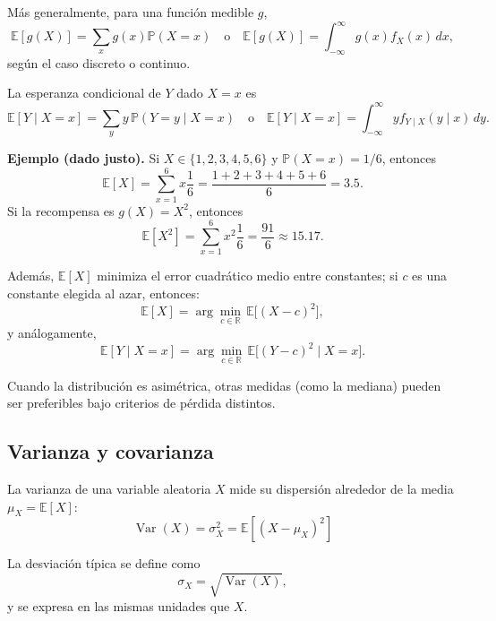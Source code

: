 \documentclass[12pt]{report} %
\begin{document}
Más generalmente, para una función medible $g$,
\begin{equation}
    \mathbb{E}[g(X)] = \sum_x g(x)\mathbb{P}(X=x)
    \quad\text{o}\quad
    \mathbb{E}[g(X)] = \int_{-\infty}^{\infty} g(x) f_X(x)\,dx,
    \label{eq:expected_value_function}
\end{equation}
según el caso discreto o continuo.

La esperanza condicional de $Y$ dado $X=x$ es
\begin{equation}
    \mathbb{E}[Y\mid X=x]=\sum_y y\,\mathbb{P}(Y=y\mid X=x)
    \quad\text{o}\quad
    \mathbb{E}[Y\mid X=x]=\int_{-\infty}^{\infty} y f_{Y\mid X}(y\mid x)\,dy.
    \label{eq:conditional_expectation_definition}
\end{equation}

\textbf{Ejemplo (dado justo).} Si $X\in\{1,2,3,4,5,6\}$ y $\mathbb{P}(X=x)=1/6$, entonces
$$
    \mathbb{E}[X]=\sum_{x=1}^{6} x\frac{1}{6}=\frac{1+2+3+4+5+6}{6}=3.5.
$$
Si la recompensa es $g(X)=X^2$, entonces
$$
    \mathbb{E}[X^2]=\sum_{x=1}^{6} x^2\frac{1}{6}=\frac{91}{6}\approx 15.17.
$$

Además, $\mathbb{E}[X]$ minimiza el error cuadrático medio entre constantes; si $c$ es una constante elegida al azar, entonces:
\begin{equation}
    \mathbb{E}[X]=\arg\min_{c\in\mathbb{R}}\,\mathbb{E}\big[(X-c)^2\big],
    \label{eq:mean_mse_optimality}
\end{equation}
y análogamente,
\begin{equation}
    \mathbb{E}[Y\mid X=x]=\arg\min_{c\in\mathbb{R}}\,\mathbb{E}\big[(Y-c)^2\mid X=x\big].
    \label{eq:conditional_mean_mse_optimality}
\end{equation}

Cuando la distribución es asimétrica, otras medidas (como la mediana) pueden ser preferibles bajo criterios de pérdida distintos.

\subsection{Varianza y covarianza}

La varianza de una variable aleatoria $X$ mide su dispersión alrededor de la media $\mu_X=\mathbb{E}[X]$:
\begin{equation}
    \operatorname{Var}(X)=\sigma_X^2=\mathbb{E}\left[(X-\mu_X)^2\right]
    \label{eq:variance_definition_stat}
\end{equation}

La desviación típica se define como
\begin{equation}
    \sigma_X=\sqrt{\operatorname{Var}(X)},
    \label{eq:std_definition_stat}
\end{equation}
y se expresa en las mismas unidades que $X$.
\end{document}
